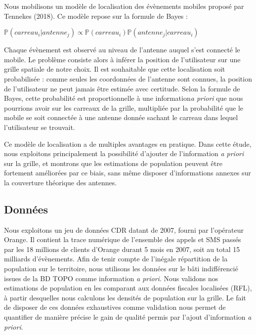 Nous mobilisons un modèle de localisation des évènements mobiles proposé par Tennekes (2018). Ce modèle repose sur la formule de Bayes :

\begin{center}
\begingroup
\large
$\mathbb{P}(carreau_i | antenne_j) \propto \mathbb{P}(carreau_i) \mathbb{P}(antenne_j | carreau_i)$
\endgroup
\end{center}

Chaque évènement est observé au niveau de l'antenne auquel s'est connecté le mobile. Le problème consiste alors à inférer la position de l'utilisateur sur une grille spatiale de notre choix. Il est souhaitable que cette localisation soit probabilisée : comme seules les coordonnées de l'antenne sont connues, la position de l'utilisateur ne peut jamais être estimée avec certitude. Selon la formule de Bayes, cette probabilité est proportionnelle à une information\textit{a priori} que nous pourrions avoir sur les carreaux de la grille, multipliée par la probabilité que le mobile se soit connectée à une antenne donnée sachant le carreau dans lequel l'utilisateur se trouvait.

Ce modèle de localisation a de multiples avantages en pratique. Dans cette étude, nous exploitons principalement la possibilité d'ajouter de l'information \textit{a priori} sur la grille, et montrons que les estimations de population peuvent être fortement améliorées par ce biais, sans même disposer d'informations annexes sur la couverture théorique des antennes.

\subsection*{Données}

Nous exploitons un jeu de données CDR datant de 2007, fourni par l'opérateur Orange. Il contient la trace numérique de l'ensemble des appels et SMS passés par les 18 millions de clients d'Orange durant 5 mois en 2007, soit au total 15 milliards d'évènements. Afin de tenir compte de l'inégale répartition de la population sur le territoire, nous utilisons les données sur le bâti indifférencié issues de la BD TOPO comme information \textit{a priori}. Nous validons nos estimations de population en les comparant aux données fiscales localisées (RFL), à partir desquelles nous calculons les densités de population sur la grille. Le fait de disposer de ces données exhaustives comme validation nous permet de quantifier de manière précise le gain de qualité permis par l'ajout d'information \textit{a priori}.

